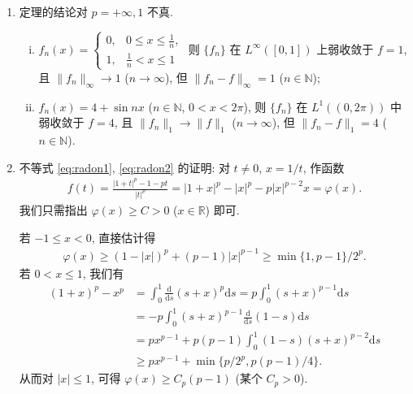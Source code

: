 \documentclass[../../main.tex]{subfiles}%
\begin{document}
\begin{remark}
\begin{enumerate}[(1)]
\item 定理的结论对 $p=+\infty,1$ 不真.
\begin{enumerate}[(i)]
\item $f_n(x)=
\begin{cases}
0, & 0\leqslant x\leqslant \frac{1}{n}, \\
1, & \frac{1}{n}<x\leqslant 1
\end{cases}$
则 $\{f_n\}$ 在 $L^\infty([0,1])$ 上弱收敛于 $f=1$, 且 $\|f_n\|_\infty\to 1$ ($n\to\infty$), 但 $\|f_n-f\|_\infty=1$ ($n\in\mathbb{N}$);

\item $f_n(x)=4+\sin nx$ ($n\in\mathbb{N}$, $0<x<2\pi$), 则 $\{f_n\}$ 在 $L^1((0,2\pi))$ 中弱收敛于 $f=4$, 且 $\|f_n\|_1\to\|f\|_1$ ($n\to\infty$), 但 $\|f_n-f\|_1=4$ ($n\in\mathbb{N}$).
\end{enumerate}

\item 不等式 \eqref{eq:radon1}, \eqref{eq:radon2} 的证明:
对 $t\neq 0$, $x=1/t$, 作函数
\begin{align*}
f(t)=\frac{|1+t|^p-1-pt}{|t|^p}=|1+x|^p-|x|^p-p|x|^{p-2}x=\varphi(x).
\end{align*}
我们只需指出 $\varphi(x)\geqslant C>0$ ($x\in\mathbb{R}$) 即可.

若 $-1\leqslant x<0$, 直接估计得
\begin{align*}
\varphi(x)\geqslant(1-|x|)^p+(p-1)|x|^{p-1}\geqslant\min\{1,p-1\}/2^p.
\end{align*}
若 $0<x\leqslant 1$, 我们有
\begin{align*}
(1+x)^p-x^p
&=\int_0^1\frac{\mathrm{d}}{\mathrm{d}s}(s+x)^p\mathrm{d}s=p\int_0^1(s+x)^{p-1}\mathrm{d}s \\
&=-p\int_0^1(s+x)^{p-1}\frac{\mathrm{d}}{\mathrm{d}s}(1-s)\mathrm{d}s \\
&=px^{p-1}+p(p-1)\int_0^1(1-s)(s+x)^{p-2}\mathrm{d}s \\
&\geqslant px^{p-1}+\min\{p/2^p,p(p-1)/4\}.
\end{align*}
从而对 $|x|\leqslant 1$, 可得 $\varphi(x)\geqslant C_p(p-1)$ (某个 $C_p>0$).


\end{enumerate}
\end{remark}
\end{document}
